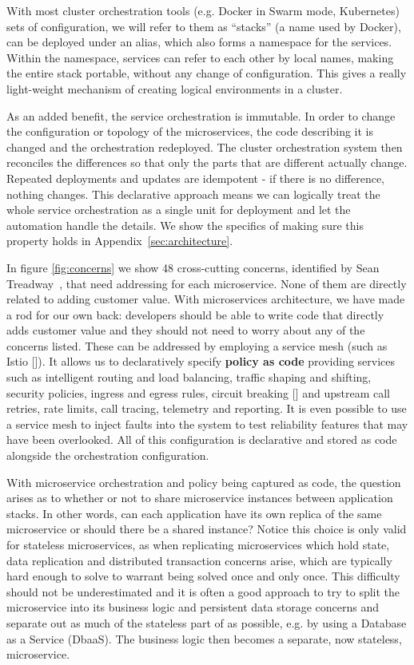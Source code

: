 \documentclass[reprint,amsmath,amssymb,aps]{revtex4-1}
\begin{document}
With most cluster orchestration tools (e.g. Docker in Swarm mode, Kubernetes) sets of configuration, we will refer to them as “stacks” (a name used by Docker), can be deployed under an alias, which also forms a namespace for the services. Within the namespace, services can refer to each other by local names, making the entire stack portable, without any change of configuration. This gives a really light-weight mechanism of creating logical environments in a cluster.

As an added benefit, the service orchestration is immutable. In order to change the configuration or topology of the microservices, the code describing it is changed and the orchestration redeployed. The cluster orchestration system then reconciles the differences so that only the parts that are different actually change. Repeated deployments and updates are idempotent - if there is no difference, nothing changes. This declarative approach means we can logically treat the whole service orchestration as a single unit for deployment and let the automation handle the details. We show the specifics of making sure this property holds in Appendix~\ref{sec:architecture}.

In figure \ref{fig:concerns} we show 48 cross-cutting concerns, identified by Sean Treadway~\cite{Treadway17:online}, that need addressing for each microservice. None of them are directly related to adding customer value. With microservices architecture, we have made a rod for our own back: developers should be able to write code that directly adds customer value and they should not need to worry about any of the concerns listed. These can be addressed by employing a service mesh (such as Istio []). It allows us to declaratively specify \textbf{policy as code} providing services such as intelligent routing and load balancing, traffic shaping and shifting, security policies, ingress and egress rules, circuit breaking [] and upstream call retries, rate limits, call tracing, telemetry and reporting. It is even possible to use a service mesh to inject faults into the system to test reliability features that may have been overlooked. All of this configuration is declarative and stored as code alongside the orchestration configuration.

With microservice orchestration and policy being captured as code, the question arises as to whether or not to share microservice instances between application stacks. In other words, can each application have its own replica of the same microservice or should there be a shared instance? Notice this choice is only valid for stateless microservices, as when replicating microservices which hold state, data replication and distributed transaction concerns arise, which are typically hard enough to solve to warrant being solved once and only once. This difficulty should not be underestimated and it is often a good approach to try to split the microservice into its business logic and persistent data storage concerns and separate out as much of the stateless part of as possible, e.g. by using a Database as a Service (DbaaS). The business logic then becomes a separate, now stateless, microservice.
\end{document}
